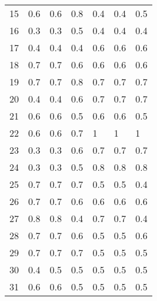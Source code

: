 \begin{table}[]
\begin{tabular}{l|lll|lll}
15              & 0.6                  & 0.6       & 0.8     & 0.4     & 0.4 & 0.5     \\
16              & 0.3                  & 0.3       & 0.5     & 0.4     & 0.4 & 0.4     \\
17              & 0.4                  & 0.4       & 0.4     & 0.6     & 0.6 & 0.6     \\
18              & 0.7                  & 0.7       & 0.6     & 0.6     & 0.6 & 0.6     \\
19              & 0.7                  & 0.7       & 0.8     & 0.7     & 0.7 & 0.7     \\
20              & 0.4                  & 0.4       & 0.6     & 0.7     & 0.7 & 0.7     \\
21              & 0.6                  & 0.6       & 0.5     & 0.6     & 0.6 & 0.5     \\
22              & 0.6                  & 0.6       & 0.7     & 1       & 1   & 1       \\
23              & 0.3                  & 0.3       & 0.6     & 0.7     & 0.7 & 0.7     \\
24              & 0.3                  & 0.3       & 0.5     & 0.8     & 0.8 & 0.8     \\
25              & 0.7                  & 0.7       & 0.7     & 0.5     & 0.5 & 0.4     \\
26              & 0.7                  & 0.7       & 0.6     & 0.6     & 0.6 & 0.6     \\
27              & 0.8                  & 0.8       & 0.4     & 0.7     & 0.7 & 0.4     \\
28              & 0.7                  & 0.7       & 0.6     & 0.5     & 0.5 & 0.6     \\
29              & 0.7                  & 0.7       & 0.7     & 0.5     & 0.5 & 0.5     \\
30              & 0.4                  & 0.5       & 0.5     & 0.5     & 0.5 & 0.5     \\
31              & 0.6                  & 0.6       & 0.5     & 0.5     & 0.5 & 0.5    
\end{tabular}
\end{table}